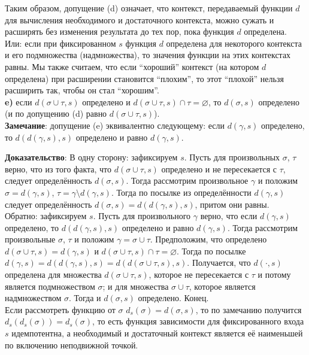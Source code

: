 Таким образом, допущение (d) означает, что контекст, передаваемый функции $d$ для вычисления необходимого и достаточного контекста, можно сужать и расширять без изменения результата до тех пор, пока функция $d$ определена. Или: если при фиксированном $s$ функция $d$ определена для некоторого контекста и его подмножества (надмножества), то значения функции на этих контекстах равны. Мы также считаем, что если ``хороший'' контекст (на котором $d$ определена) при расширении становится ``плохим'', то этот ``плохой'' нельзя расширить так, чтобы он стал ``хорошим''.\\

\indent \textbf{e)} если $d(\sigma \cup \tau, s)$ определено и $d(\sigma \cup \tau, s) \cap \tau = \varnothing$, то $d(\sigma, s)$ определено (и по допущению (d) равно $d(\sigma \cup \tau, s)$).\\

\textbf{Замечание}: допущение (e) эквивалентно следующему: если $d(\gamma, s)$ определено, то $d(d(\gamma, s), s)$ определено и равно $d(\gamma, s)$.

\textbf{Доказательство}: В одну сторону: зафиксируем $s$. Пусть для произвольных $\sigma$, $\tau$ верно, что из того факта, что $d(\sigma \cup \tau, s)$ определено и не пересекается с $\tau$, следует определённость $d(\sigma, s)$. Тогда рассмотрим произвольное $\gamma$ и положим $\sigma = d(\gamma, s)$, $\tau = \gamma \setminus d(\gamma, s)$. Тогда по посылке из определённости $d(\gamma, s)$ следует определённость $d(\sigma, s) = d(d(\gamma, s), s)$, притом они равны.\\
Обратно: зафиксируем $s$. Пусть для произвольного $\gamma$ верно, что если $d(\gamma, s)$ определено, то $d(d(\gamma, s), s)$ определено и равно $d(\gamma, s)$. Тогда рассмотрим произвольные $\sigma$, $\tau$ и положим $\gamma = \sigma \cup \tau$. Предположим, что определено $d(\sigma \cup \tau, s) = d(\gamma, s)$ и $d(\sigma \cup \tau, s) \cap \tau = \varnothing$. Тогда по посылке $d(\gamma, s) = d(d(\gamma, s), s) = d(d(\sigma \cup \tau, s), s)$. Получается, что $d(\cdot, s)$ определена для множества $d(\sigma \cup \tau, s)$, которое не пересекается с $\tau$ и потому является подмножеством $\sigma$; и для множества $\sigma \cup \tau$, которое является надмножеством $\sigma$. Тогда и $d(\sigma, s)$ определено.
Конец.\\

Если рассмотреть функцию от $\sigma$ $d_s(\sigma) = d(\sigma, s)$, то по замечанию получится $d_s(d_s(\sigma)) = d_s(\sigma)$, то есть функция зависимости для фиксированного входа $s$ идемпотентна, а необходимый и достаточный контекст является её наименьшей по включению неподвижной точкой.\\


